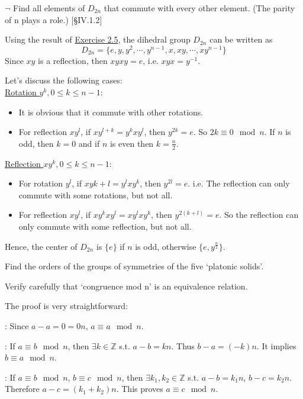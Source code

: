 \begin{problem}[2.7]
 $\neg$ Find all elements of $D_{2n}$ that commute with every other element. (The
parity of n plays a role.) [\S IV.1.2]
\end{problem}
\begin{solution}
Using the result of \hyperlink{Exercise II.2.5}{Exercise 2.5}, the dihedral group $D_{2n}$ can be written as
$$D_{2n}=\{e, y, y^2, \cdots, y^{n-1}, x, xy,\cdots, xy^{n-1}\}$$
Since $xy$ is a reflection, then $xyxy=e$, i.e. $xyx=y^{-1}$.

Let's discuss the following cases:\\
\underline{Rotation $y^k, 0\leq k\leq n-1$}:
\begin{itemize}
\item It is obvious that it commute with other rotations.
\item For reflection $xy^l$, if $xy^{l+k} = y^kxy^l$, then $y^{2k} = e$. So $2k\equiv 0\mod n$. If $n$ is odd, then $k=0$ and if $n$ is even then $k=\frac{n}{2}$. 
\end{itemize}
\underline{Reflection $xy^{k}, 0\leq k\leq n-1$}:
\begin{itemize}
\item For rotation $y^{l}$, if $xy{k+l} = y^{l}xy^k$, then $y^{2l} = e$. i.e. The reflection can only commute with some rotations, but not all.
\item For reflection $xy^l$, if $xy^kxy^l = xy^lxy^k$, then $y^{2(k+l)} = e$. So the reflection can only commute with some reflection, but not all. 
\end{itemize}

Hence, the center of $D_{2n}$ is $\{e\}$ if $n$ is odd, otherwise $\{e, y^{\frac{n}{2}}\}$.
\end{solution}

\begin{problem}[2.8]
Find the orders of the groups of symmetries of the five ‘platonic solids’.
\end{problem}

\begin{problem}[2.9]
Verify carefully that ‘congruence mod n’ is an equivalence relation.
\end{problem}
\begin{solution}
The proof is very straightforward:

\noindent \underline{}: Since $a-a=0=0n$, $a\equiv a \mod n$.

\noindent \underline{}: If $a\equiv b \mod n$, then $\exists k\in\mathbb {Z}$ s.t. $a-b=kn$. Thus $b-a=(-k)n$. It implies $b\equiv a \mod n$.

\noindent \underline{}: If $a\equiv b \mod n$, $b\equiv c \mod n$, then $\exists k_1, k_2\in \mathbb{Z}$ s.t. $a-b=k_1 n$, $b-c = k_2 n$. Therefore
$a-c = (k_1+k_2)n$. This proves $a\equiv c\mod n$.
\end{solution}


